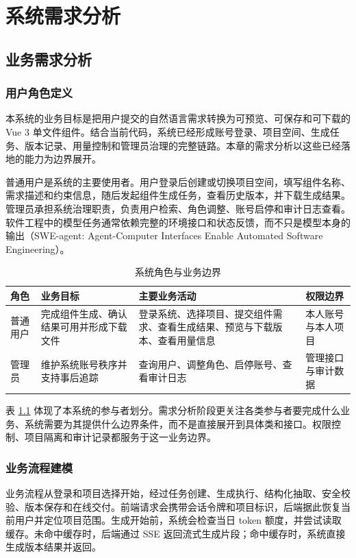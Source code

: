 ﻿\chapter{系统需求分析}

\section{业务需求分析}
\subsection{用户角色定义}
本系统的业务目标是把用户提交的自然语言需求转换为可预览、可保存和可下载的 Vue 3 单文件组件。结合当前代码，系统已经形成账号登录、项目空间、生成任务、版本记录、用量控制和管理员治理的完整链路。本章的需求分析以这些已经落地的能力为边界展开。

普通用户是系统的主要使用者。用户登录后创建或切换项目空间，填写组件名称、需求描述和约束信息，随后发起组件生成任务，查看历史版本，并下载生成结果。管理员承担系统治理职责，负责用户检索、角色调整、账号启停和审计日志查看。软件工程中的模型任务通常依赖完整的环境接口和状态反馈，而不只是模型本身的输出（SWE-agent: Agent-Computer Interfaces Enable Automated Software Engineering）\cite{yang2024sweagent}。

\begin{table}[htbp]
\centering
\caption{系统角色与业务边界}
\label{tab:chapter3-roles}
\small
\begin{tabular}{@{}p{}p{}p{}p{}@{}}
\toprule
角色 & 业务目标 & 主要业务活动 & 权限边界 \\
\midrule
普通用户 & 完成组件生成、确认结果可用并形成下载文件 & 登录系统、选择项目、提交组件需求、查看生成结果、预览与下载版本、查看用量信息 & 本人账号与本人项目 \\
管理员 & 维护系统账号秩序并支持事后追踪 & 查询用户、调整角色、启停账号、查看审计日志 & 管理接口与审计数据 \\
\bottomrule
\end{tabular}
\end{table}

表 \ref{tab:chapter3-roles} 体现了本系统的参与者划分。需求分析阶段更关注各类参与者要完成什么业务、系统需要为其提供什么边界条件，而不是直接展开到具体类和接口。权限控制、项目隔离和审计记录都服务于这一业务边界。

\subsection{业务流程建模}
业务流程从登录和项目选择开始，经过任务创建、生成执行、结构化抽取、安全校验、版本保存和在线交付。前端请求会携带会话令牌和项目标识，后端据此恢复当前用户并定位项目范围。生成开始前，系统会检查当日 token 额度，并尝试读取缓存。未命中缓存时，后端通过 SSE 返回流式生成片段；命中缓存时，系统直接生成版本结果并返回。

